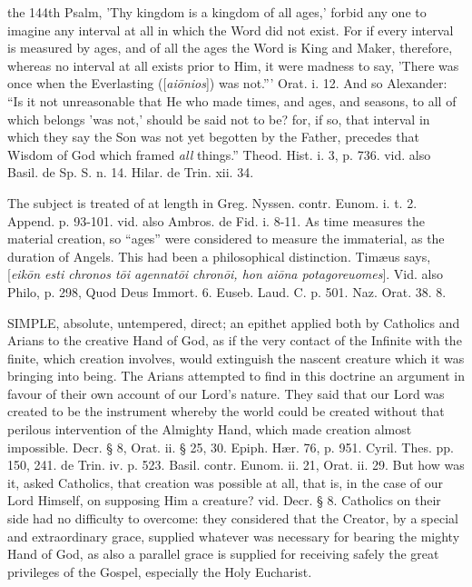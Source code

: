 the 144th Psalm, 'Thy kingdom is a kingdom of all ages,' forbid any
one to imagine any interval at all in which the Word did not exist.
For if every interval is measured by ages, and of all the ages the
Word is King and Maker, therefore, whereas no interval at all exists
prior to Him, it were madness to say, 'There was once when the
Everlasting ([\emph{ai\={o}nios}]) was not.''' Orat. i. 12. And so
Alexander: ``Is it not unreasonable that He who made times, and ages,
and seasons, to all of which belongs 'was not,' should be said not to
be? for, if so, that interval in which they say the Son was not yet
begotten by the Father, precedes that Wisdom of God which framed \emph{all}
things.'' Theod. Hist. i. 3, p. 736. vid. also Basil. de Sp. S. n. 14.
Hilar. de Trin. xii. 34.

The subject is treated of at length in Greg.
Nyssen. contr. Eunom. i. t. 2. Append. p. 93-101. vid. also Ambros. de
Fid. i. 8-11. As time measures the material creation, so ``ages'' were
considered to measure the immaterial, as the duration of Angels. This
had been a philosophical distinction. Timæus says, [\emph{eik\={o}n
esti chronos t\={o}i agennat\={o}i chron\={o}i, hon ai\={o}na
potagoreuomes}]. Vid. also Philo, p. 298, Quod Deus Immort. 6.
Euseb. Laud. C. p. 501. Naz. Orat. 38. 8.

\xsection{[Akratos]}

SIMPLE,
absolute, untempered, direct; an epithet applied both by Catholics and
Arians to the creative Hand of God, as if the very contact of the
Infinite with the finite, which creation involves, would extinguish
the nascent creature which it was bringing into being. The Arians
attempted to find in this doctrine an argument in favour of their own
account of our Lord's nature. They said that our Lord was created to
be the instrument whereby the world could be created without that
perilous intervention of the Almighty Hand, which made creation almost
impossible. Decr. § 8, Orat. ii. § 25, 30. Epiph. Hær. 76, p. 951.
Cyril. Thes. pp. 150, 241. de Trin. iv. p. 523. Basil. contr. Eunom.
ii. 21, Orat. ii. 29. But how was it, asked Catholics, that creation
was possible at all, that is, in the case of our Lord Himself, on
supposing Him a creature? vid. Decr. § 8. Catholics on their side had
no difficulty to overcome: they considered that the Creator, by a
special and extraordinary grace, supplied whatever was necessary for
bearing the mighty Hand of God, as also a parallel grace is supplied
for receiving safely the great privileges of the Gospel, especially
the Holy Eucharist.

